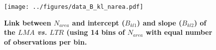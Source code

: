 \documentclass[a4paper,11pt]{article}
\begin{document}
\begin{figure}[ht]
\centering
\texttt{[image: ../figures/data\_B\_kl\_narea.pdf]}
\caption{\textbf{Link between $N_{area}$ and intercept ($B_{kl1}$) and
    slope ($B_{kl2}$) of the $LMA$ \textit{vs.} $LTR$ (using 14 bins of $N_{area}$ with equal number of observations per bin.}
\label{fig:narea_intercept}}
\end{figure}


\clearpage















\end{document}
